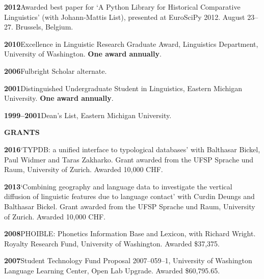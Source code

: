 \documentclass[11pt]{article}
\newcommand{\hangpara}{
 \setlength{\parindent}{0in} %
 \hangindent=0.42in %
}
\begin{document}
\vskip 6pt
\hangpara
{\bf 2012}\hspace{1ex}Awarded best paper for `A Python Library for Historical Comparative Linguistics' (with Johann-Mattis List), presented at EuroSciPy 2012. August 23--27. Brussels, Belgium.

\vskip 6pt
\hangpara
{\bf 2010}\hspace{1ex}Excellence in Linguistic Research Graduate Award, Linguistics Department, University of Washington. \textbf{One award annually}.

\vskip 6pt
\hangpara
{\bf 2006}\hspace{1ex}Fulbright Scholar alternate.

\vskip 6pt
\hangpara
{\bf 2001}\hspace{1ex}Distinguished Undergraduate Student in Linguistics, Eastern Michigan University. \textbf{One award annually}.

\vskip 6pt
\hangpara
{\bf 1999--2001}\hspace{1ex}Dean's List, Eastern Michigan University.


\vskip 20pt
\begin{flushleft}
{\bf GRANTS}
\end{flushleft}



\hangpara
{\bf 2016}\hspace{1ex}`TYPDB: a unified interface to typological databases' with Balthasar Bickel, Paul Widmer and Taras Zakharko. Grant awarded from the UFSP Sprache und Raum, University of Zurich. Awarded 10,000 CHF.

\vskip 6pt
\hangpara
{\bf 2013}\hspace{1ex}`Combining geography and language data to investigate the vertical diffusion of linguistic features due to language contact' with Curdin Deungs and Balthasar Bickel. Grant awarded from the UFSP Sprache und Raum, University of Zurich. Awarded 10,000 CHF.

\vskip 6pt
\hangpara
{\bf 2008}\hspace{1ex}PHOIBLE: Phonetics Information Base and Lexicon, with Richard Wright. Royalty Research Fund, University of Washington. Awarded \$37,375.

\vskip 6pt
\hangpara
{\bf 2007}\hspace{1ex}Student Technology Fund Proposal 2007--059--1, University of Washington Language Learning Center, Open Lab Upgrade. Awarded \$60,795.65.
\end{document}

